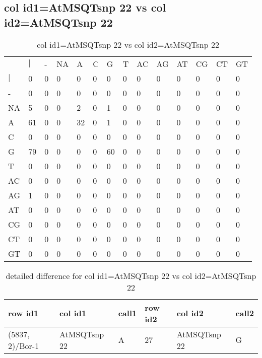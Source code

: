 \subsection{col id1=AtMSQTsnp 22 vs col id2=AtMSQTsnp 22}
\begin{center}
\begin{longtable}{|l|l|l|l|l|l|l|l|l|l|l|l|l|l|}
\caption{col id1=AtMSQTsnp 22 vs col id2=AtMSQTsnp 22} \label{table_dm580}\\
\hline
\\
\hline
&$|$&-&NA&A&C&G&T&AC&AG&AT&CG&CT&GT\\
$|$&0&0&0&0&0&0&0&0&0&0&0&0&0\\
-&0&0&0&0&0&0&0&0&0&0&0&0&0\\
NA&5&0&0&2&0&1&0&0&0&0&0&0&0\\
A&61&0&0&32&0&1&0&0&0&0&0&0&0\\
C&0&0&0&0&0&0&0&0&0&0&0&0&0\\
G&79&0&0&0&0&60&0&0&0&0&0&0&0\\
T&0&0&0&0&0&0&0&0&0&0&0&0&0\\
AC&0&0&0&0&0&0&0&0&0&0&0&0&0\\
AG&1&0&0&0&0&0&0&0&0&0&0&0&0\\
AT&0&0&0&0&0&0&0&0&0&0&0&0&0\\
CG&0&0&0&0&0&0&0&0&0&0&0&0&0\\
CT&0&0&0&0&0&0&0&0&0&0&0&0&0\\
GT&0&0&0&0&0&0&0&0&0&0&0&0&0\\
\hline
\end{longtable}
\end{center}

\begin{center}
\begin{longtable}{|l|l|l|l|l|l|}
\caption{detailed difference for col id1=AtMSQTsnp 22 vs col id2=AtMSQTsnp 22} \label{table_dm581}\\
\hline
row id1&col id1&call1&row id2&col id2&call2\\
\hline
(5837, 2)/Bor-1&AtMSQTsnp 22&A&27&AtMSQTsnp 22&G\\
\hline
\end{longtable}
\end{center}

